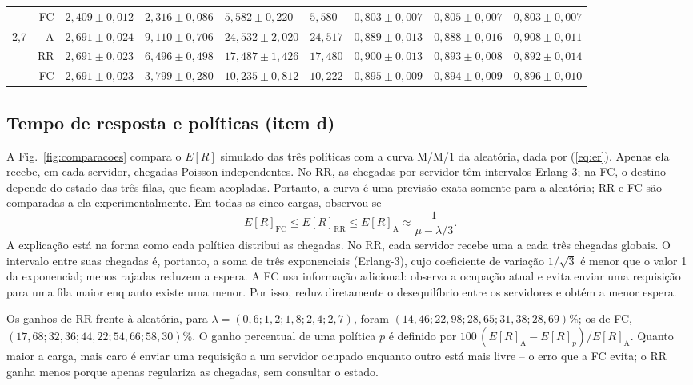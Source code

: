 \documentclass[conference,a4paper]{IEEEtran}
\begin{document}
\begin{table}[t]
\begin{tabular}{@{}rrlllllll@{}}
    & FC & $2,409\pm0,012$ & $2,316\pm0,086$ & $5,582\pm0,220$ & $5,580$ & $0,803\pm0,007$ & $0,805\pm0,007$ & $0,803\pm0,007$ \\
2,7 & A  & $2,691\pm0,024$ & $9,110\pm0,706$ & $24,532\pm2,020$ & $24,517$ & $0,889\pm0,013$ & $0,888\pm0,016$ & $0,908\pm0,011$ \\
    & RR & $2,691\pm0,023$ & $6,496\pm0,498$ & $17,487\pm1,426$ & $17,480$ & $0,900\pm0,013$ & $0,893\pm0,008$ & $0,892\pm0,014$ \\
    & FC & $2,691\pm0,023$ & $3,799\pm0,280$ & $10,235\pm0,812$ & $10,222$ & $0,895\pm0,009$ & $0,894\pm0,009$ & $0,896\pm0,010$ \\
\bottomrule
\end{tabular}
\end{table}

\subsection{Tempo de resposta e políticas (item d)}

A Fig.~\ref{fig:comparacoes} compara o $E[R]$ simulado das três políticas
com a curva M/M/1 da aleatória, dada por (\ref{eq:er}). Apenas ela recebe,
em cada servidor, chegadas Poisson independentes. No RR, as chegadas por
servidor têm intervalos Erlang-3; na FC, o destino depende do estado das três
filas, que ficam acopladas. Portanto, a curva é uma previsão exata somente
para a aleatória; RR e FC são comparadas a ela experimentalmente. Em todas
as cinco cargas, observou-se
\begin{equation}
 E[R]_{\mathrm{FC}}\le E[R]_{\mathrm{RR}}\le E[R]_{\mathrm{A}}
 \approx\frac{1}{\mu-\lambda/3}.
 \label{eq:ordem}
\end{equation}
A explicação está na forma como cada política distribui as chegadas. No RR,
cada servidor recebe uma a cada três chegadas globais. O intervalo entre suas
chegadas é, portanto, a soma de três exponenciais (Erlang-3), cujo
coeficiente de variação $1/\sqrt{3}$ é menor que o valor 1 da exponencial;
menos rajadas reduzem a espera. A FC usa
informação adicional: observa a ocupação atual e evita enviar uma requisição
para uma fila maior enquanto existe uma menor. Por isso, reduz diretamente o
desequilíbrio entre os servidores e obtém a menor espera.

Os ganhos de RR frente à aleatória, para
$\lambda=(0{,}6;1{,}2;1{,}8;2{,}4;2{,}7)$, foram
$(14{,}46;22{,}98;28{,}65;31{,}38;28{,}69)$\%; os de FC,
$(17{,}68;32{,}36;44{,}22;54{,}66;58{,}30)$\%. O ganho percentual de uma
política $p$ é definido por
$100\,(E[R]_{\mathrm{A}}-E[R]_p)/E[R]_{\mathrm{A}}$. Quanto maior a carga,
mais caro é enviar uma requisição a um servidor ocupado enquanto outro está
mais livre -- o erro que a FC evita; o RR ganha menos porque apenas
regulariza as chegadas, sem consultar o estado.
\end{document}
